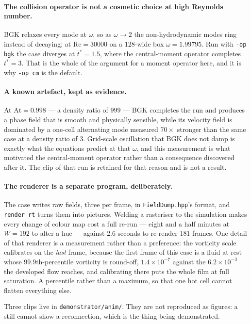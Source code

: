 \documentclass[11pt,a4paper]{article}
\newcommand{\code}[1]{\texttt{\small #1}}
\newcommand{\e}[1]{\times 10^{#1}}
\begin{document}
\paragraph{The collision operator is not a cosmetic choice at high Reynolds
number.} BGK relaxes every mode at $\omega$, so as $\omega\to2$ the
non-hydrodynamic modes ring instead of decaying; at $\mathrm{Re} = 30000$ on a
$128$-wide box $\omega = 1.99795$. Run with \code{-op bgk} the case diverges at
$t^{*} = 1.5$, where the central-moment operator completes $t^{*} = 3$. That is
the whole of the argument for a moment operator here, and it is why \code{-op cm}
is the default.

\paragraph{A known artefact, kept as evidence.} At $\mathrm{At} = 0.998$ ---
a density ratio of $999$ --- BGK completes the run and produces a phase field
that is smooth and physically sensible, while its velocity field is dominated by
a one-cell alternating mode measured $70\times$ stronger than the same case at a
density ratio of $3$. Grid-scale oscillation that BGK does not damp is exactly
what the equations predict at that $\omega$, and this measurement is what
motivated the central-moment operator rather than a consequence discovered
after it. The clip of that run is retained for that reason and is not a result.

\paragraph{The renderer is a separate program, deliberately.} The case writes
raw fields, three per frame, in \code{FieldDump.hpp}'s format, and
\code{render\_rt} turns them into pictures. Welding a rasteriser to the
simulation makes every change of colour map cost a full re-run --- eight and a
half minutes at $W = 192$ to alter a hue --- against $2.6$ seconds to re-render
$181$ frames. One detail of that renderer is a measurement rather than a
preference: the vorticity scale calibrates on the \emph{last} frame, because the
first frame of this case is a fluid at rest whose 99.9th-percentile vorticity is
round-off, $1.4\e{-7}$ against the $6.2\e{-3}$ the developed flow reaches, and
calibrating there puts the whole film at full saturation. A percentile rather
than a maximum, so that one hot cell cannot flatten everything else.

Three clips live in \code{demonstrator/anim/}. They are not reproduced as
figures: a still cannot show a reconnection, which is the thing being
demonstrated.
\end{document}
